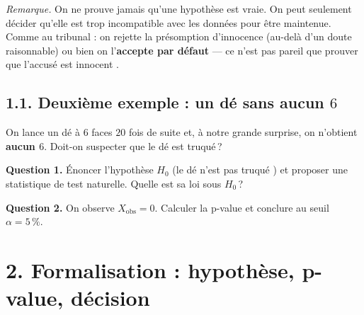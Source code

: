 \medskip

\textit{Remarque.} On ne \og prouve \fg{} jamais qu'une hypothèse est vraie. On peut seulement décider qu'elle est trop incompatible avec les données pour être maintenue. Comme au tribunal : on rejette la présomption d'innocence (au-delà d'un doute raisonnable) ou bien on l'\textbf{accepte par défaut} --- ce n'est pas pareil que \og prouver que l'accusé est innocent \fg.

\subsection*{1.1. Deuxième exemple : un dé sans aucun \texorpdfstring{$6$}{6}}

On lance un dé à $6$ faces $20$ fois de suite et, à notre grande surprise, on n'obtient \textbf{aucun $6$}. Doit-on suspecter que le dé est truqué\,?

\textbf{Question 1.} Énoncer l'hypothèse $H_0$ (\og le dé n'est pas truqué \fg) et proposer une statistique de test naturelle. Quelle est sa loi sous $H_0$\,?


\textbf{Question 2.} On observe $X_{\text{obs}} = 0$. Calculer la p-value et conclure au seuil $\alpha = 5\,\%$.


\section*{2. Formalisation : hypothèse, p-value, décision}

